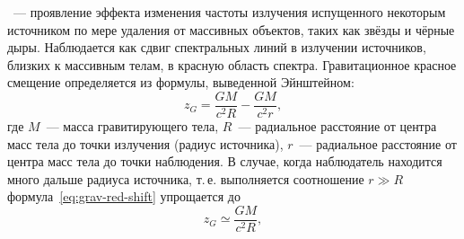 ~--- проявление эффекта изменения частоты излучения испущенного некоторым источником по мере удаления от массивных объектов, таких как звёзды и чёрные дыры. Наблюдается как сдвиг спектральных линий в излучении источников, близких к массивным телам, в красную область спектра. Гравитационное красное смещение определяется из формулы, выведенной Эйнштейном:
\begin{equation}
z_G=\dfrac{GM}{c^2 R}-\dfrac{GM}{c^2 r},
\label{eq:grav-red-shift}
\end{equation}
где $M$~--- масса гравитирующего тела, $R$~--- радиальное расстояние от центра масс тела до точки излучения (радиус источника), $r$~---  радиальное расстояние от центра масс тела до точки наблюдения. В случае, когда наблюдатель находится много дальше радиуса источника, т.\,е. выполняется соотношение $r \gg R$ формула~\eqref{eq:grav-red-shift} упрощается до \begin{equation}
	z_G \simeq \dfrac{GM}{c^2 R},
\end{equation}
